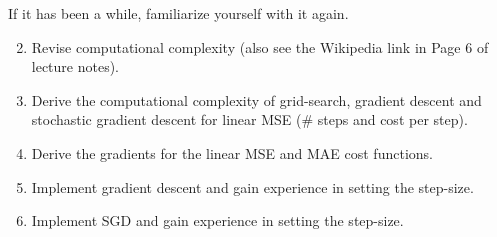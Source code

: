 If it has been a while, familiarize yourself with it again.

\begin{enumerate}
  \setcounter{enumi}{1}
  \item Revise computational complexity (also see the Wikipedia link in Page 6 of lecture notes).

  \item Derive the computational complexity of grid-search, gradient descent and stochastic gradient descent for linear MSE (\# steps and cost per step).

  \item Derive the gradients for the linear MSE and MAE cost functions.

  \item Implement gradient descent and gain experience in setting the step-size.

  \item Implement SGD and gain experience in setting the step-size.

\end{enumerate}